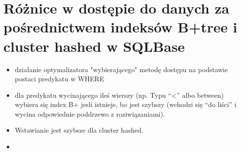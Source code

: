 \documentclass[a4paper,twoside]{article}
\begin{document}
  \section*{Różnice w dostępie do danych za pośrednictwem indeksów B+tree i cluster hashed w SQLBase}
      \begin{itemize}
      \item działanie optymalizatora "wybierającego" metodę dostępu na podstawie postaci predykatu w WHERE
      \item dla predykatu wycinającego ileś wierszy (np. Typu “<” albo between) wybiera się index B+ jesli istnieje, bo jest szybszy (wchodzi się “do liści” i wycina odpowiednie poddrzewo z roziwiązaniami).
      \item Wstawianie jest szybsze dla cluster hashed.
      \item 
      \end{itemize}


  
\end{document}
